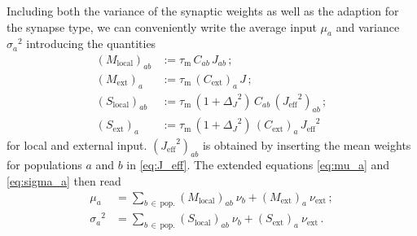 Including both the variance of the synaptic weights as well as the adaption 
for the synapse type,
we can conveniently write
the average input $\mu_a$ and variance ${\sigma_a}^2$ 
introducing the quantities
\begin{align}
    \label{eq:S_l}
    (M_\text{local})_{ab} 
        &:= \tau_\text{m} \, C_{ab} \,J_{ab} \,;\\ 
    (M_\text{ext})_{a} 
        &:= \tau_\text{m} \, (C_\text{ext})_a \,J \,;\\
    (S_\text{local})_{ab} 
        &:= \tau_\text{m} \,(1 + {\Delta_J}^2) \,C_{ab} \,({J_\text{eff}}^2)_{ab} \,;\\
    (S_\text{ext})_{a} 
        &:= \tau_\text{m} \,(1 + {\Delta_J}^2) \,(C_\text{ext})_a \,{J_\text{eff}}^2 
\end{align}
for local and external input. $({J_\text{eff}}^2)_{ab}$ is obtained by inserting 
the mean weights for populations $a$ and $b$ in \autoref{eq:J_eff}. 
The extended equations \eqref{eq:mu_a} and \eqref{eq:sigma_a} then read
\begin{align}
    \label{eq:mu_a_plus}
    \mu_a        &= 
        \sum_{b \,\in \,\text{pop.}}  (M_\text{local})_{ab} \: \nu_b 
        + (M_\text{ext})_{a} \: \nu_\text{ext} \, ; \\
    \label{eq:sigma_a_plus}
    {\sigma_a}^2 &= 
        \sum_{b \,\in \,\text{pop.}} (S_\text{local})_{ab} \: \nu_b
        + (S_\text{ext})_{a}  \:\nu_\text{ext}\,.
\end{align}


